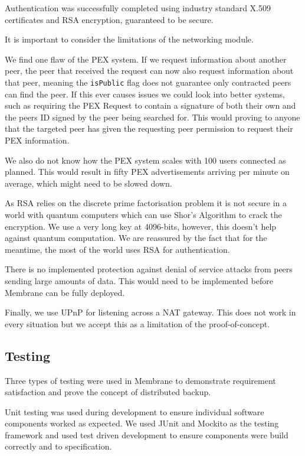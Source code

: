\documentclass[11pt, a4paper, twoside]{report}
\def\code#1{\texttt{#1}}
\begin{document}
Authentication was successfully completed using industry standard X.509 certificates and RSA encryption, guaranteed to be secure.

It is important to consider the limitations of the networking module.

We find one flaw of the PEX system. If we request information about another peer, the peer that received the request can now also request information about that peer, meaning the \code{isPublic} flag does not guarantee only contracted peers can find the peer. If this ever causes issues we could look into better systems, such as requiring the PEX Request to contain a signature of both their own and the peers ID signed by the peer being searched for. This would proving to anyone that the targeted peer has given the requesting peer permission to request their PEX information.

We also do not know how the PEX system scales with 100 users connected as planned. This would result in fifty PEX advertisements arriving per minute on average, which might need to be slowed down.

As RSA relies on the discrete prime factorisation problem it is not secure in a world with quantum computers which can use Shor's Algorithm to crack the encryption. We use a very long key at 4096-bits, however, this doesn't help against quantum computation. We are reassured by the fact that for the meantime, the most of the world uses RSA for authentication.

There is no implemented protection against denial of service attacks from peers sending large amounts of data. This would need to be implemented before Membrane can be fully deployed.

Finally, we use UPnP for listening across a NAT gateway. This does not work in every situation but we accept this as a limitation of the proof-of-concept.

\subsection{Testing}

Three types of testing were used in Membrane to demonstrate requirement satisfaction and prove the concept of distributed backup.

Unit testing was used during development to ensure individual software components worked as expected. We used JUnit and Mockito as the testing framework and used test driven development to ensure components were build correctly and to specification.
\end{document}
